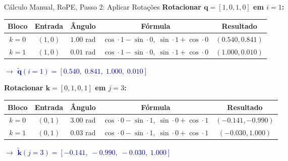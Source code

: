 \documentclass[aspectratio=169, xcolor=dvipsnames]{beamer}
\begin{document}
  \begin{frame}{Cálculo Manual, RoPE, Passo 2: Aplicar Rotações}
    \textbf{Rotacionar $\mathbf{q} = [1, 0, 1, 0]$ em $i = 1$:}

    {\small
    \begin{tabular}{ccccc}
      \toprule
      Bloco & Entrada & Ângulo & Fórmula & Resultado \\
      \midrule
      \rowcolor{CellGreen} $k{=}0$ & $(1,0)$ & $1.00$ rad & $\cos \cdot 1 - \sin \cdot 0,\; \sin \cdot 1 + \cos \cdot 0$ & $(0.540, 0.841)$ \\
      \rowcolor{CellGreen} $k{=}1$ & $(1,0)$ & $0.01$ rad & $\cos \cdot 1 - \sin \cdot 0,\; \sin \cdot 1 + \cos \cdot 0$ & $(1.000, 0.010)$ \\
      \bottomrule
    \end{tabular}}

    $\to$ \textcolor{DarkBlue}{$\tilde{\mathbf{q}}(i{=}1) = [0.540,\; 0.841,\; 1.000,\; 0.010]$}

    \vspace{0.5em}
    \textbf{Rotacionar $\mathbf{k} = [0, 1, 0, 1]$ em $j = 3$:}

    {\small
    \begin{tabular}{ccccc}
      \toprule
      Bloco & Entrada & Ângulo & Fórmula & Resultado \\
      \midrule
      \rowcolor{CellGreen} $k{=}0$ & $(0,1)$ & $3.00$ rad & $\cos \cdot 0 - \sin \cdot 1,\; \sin \cdot 0 + \cos \cdot 1$ & $(-0.141, -0.990)$ \\
      \rowcolor{CellGreen} $k{=}1$ & $(0,1)$ & $0.03$ rad & $\cos \cdot 0 - \sin \cdot 1,\; \sin \cdot 0 + \cos \cdot 1$ & $(-0.030, 1.000)$ \\
      \bottomrule
    \end{tabular}}

    $\to$ \textcolor{DarkBlue}{$\tilde{\mathbf{k}}(j{=}3) = [-0.141,\; -0.990,\; -0.030,\; 1.000]$}
  \end{frame}
\end{document}
